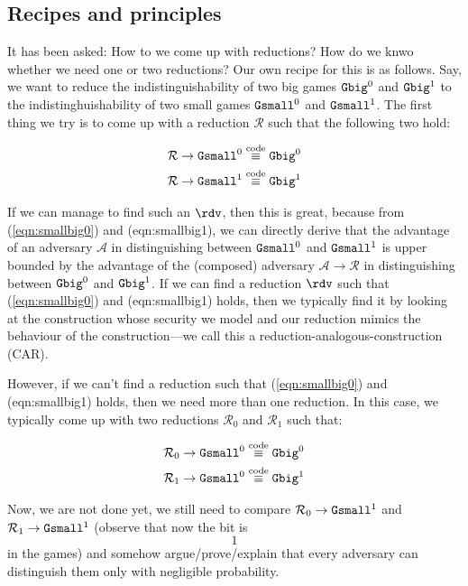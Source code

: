 
\subsection{Recipes and principles}
It has been asked: How to we come up with reductions? How do we knwo whether we need one or two reductions? Our own recipe for this is as follows. Say, we want to reduce the indistinguishability of two big games $\text{\texttt{Gbig}}^0$ and $\text{\texttt{Gbig}}^1$ to the indistinghuishability of two small games $\text{\texttt{Gsmall}}^0$ and $\text{\texttt{Gsmall}}^1$. The first thing we try is to come up with a reduction $\mathcal{R}$ such that the following two hold:

\begin{align}
    \label{eqn:smallbig0} & \mathcal{R}\rightarrow\text{\texttt{Gsmall}}^0\stackrel{\text{code}}{\equiv}\text{\texttt{Gbig}}^0 \\
    \label{eqn:smallbig1} & \mathcal{R}\rightarrow\text{\texttt{Gsmall}}^1\stackrel{\text{code}}{\equiv}\text{\texttt{Gbig}}^1
\end{align}

If we can manage to find such an $\rdv$, then this is great, because from (\ref{eqn:smallbig0}) and (eqn:smallbig1), we can directly derive that the advantage of an adversary $\mathcal{A}$ in distinguishing between $\text{\texttt{Gsmall}}^0$ and $\text{\texttt{Gsmall}}^1$ is upper bounded by the advantage of the (composed) adversary $\mathcal{A}\rightarrow\mathcal{R}$ in distinguishing between $\text{\texttt{Gbig}}^0$ and $\text{\texttt{Gbig}}^1$. If we can find a reduction $\rdv$ such that (\ref{eqn:smallbig0}) and (eqn:smallbig1) holds, then we typically find it by looking at the construction whose security we model and our reduction mimics the behaviour of the construction---we call this a reduction-analogous-construction (CAR).

However, if we can't find a reduction such that  (\ref{eqn:smallbig0}) and (eqn:smallbig1) holds, then we need more than one reduction. In this case, we typically come up with two reductions $\mathcal{R}_0$ and $\mathcal{R}_1$ such that:

\begin{align}
    \label{eqn:smallbig00} & \mathcal{R}_0\rightarrow\text{\texttt{Gsmall}}^0\stackrel{\text{code}}{\equiv}\text{\texttt{Gbig}}^0 \\
    \label{eqn:smallbig11} & \mathcal{R}_1\rightarrow\text{\texttt{Gsmall}}^0\stackrel{\text{code}}{\equiv}\text{\texttt{Gbig}}^1
\end{align}

Now, we are not done yet, we still need to compare $\mathcal{R}_0\rightarrow\text{\texttt{Gsmall}}^1$ and $\mathcal{R}_1\rightarrow\text{\texttt{Gsmall}}^1$ (observe that now the bit is $$1$$ in the games) and somehow argue/prove/explain that every adversary can distinguish them only with negligible probability.